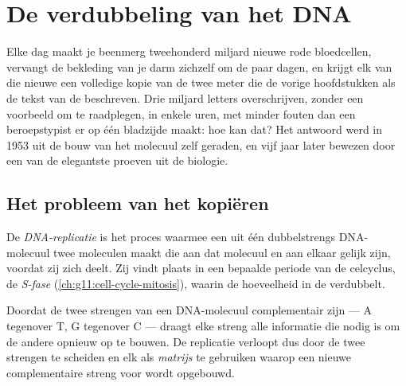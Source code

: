 \chapter{De verdubbeling van het DNA}\label{ch:g11:dna-replication}

Elke dag maakt je beenmerg tweehonderd miljard nieuwe rode bloedcellen,
vervangt de bekleding van je darm zichzelf om de paar dagen, en krijgt
elk van die nieuwe  een volledige kopie van de twee meter  die
de vorige hoofdstukken als de tekst van de  beschreven. Drie miljard
letters overschrijven, zonder een voorbeeld om te raadplegen, in enkele
uren, met minder fouten dan een beroepstypist er op één bladzijde maakt:
hoe kan dat? Het antwoord werd in 1953 uit de bouw van het molecuul zelf
geraden, en vijf jaar later bewezen door een van de elegantste proeven
uit de biologie.

\section{Het probleem van het kopiëren}

\begin{definition}[Replicatie]\label{def:g11:dna-replication:replication}
De \emph{DNA-replicatie} is het proces waarmee een
 uit één dubbelstrengs DNA-molecuul twee moleculen maakt die aan dat
molecuul en aan elkaar gelijk zijn, voordat zij zich deelt. Zij vindt
plaats in een bepaalde periode van de celcyclus, de \emph{S-fase}
(\cref{ch:g11:cell-cycle-mitosis}), waarin de hoeveelheid  in de
 verdubbelt.
\end{definition}

\begin{proposition}\label{prop:g11:dna-replication:template}
Doordat de twee strengen van een DNA-molecuul complementair zijn --- A
tegenover T, G tegenover C --- draagt elke streng alle informatie die
nodig is om de andere opnieuw op te bouwen. De replicatie verloopt dus
door de twee strengen te scheiden en elk als \emph{matrijs} te gebruiken
waarop een nieuwe complementaire streng  voor  wordt
opgebouwd.
\end{proposition}
\admitted

